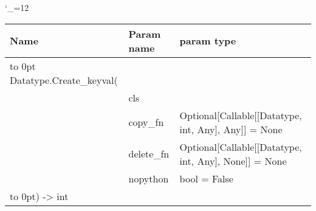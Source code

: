 \begingroup \catcode`\_=12 \tt
\begin{tabular}{lll}
\toprule
\textrm{Name}&\textrm{Param name}&\textrm{param type}\\
\midrule
\hbox to 0pt {Datatype.Create_keyval(\hss}\\
& cls\\
& copy_fn & Optional[Callable[[Datatype, int, Any], Any]] = None\\
& delete_fn & Optional[Callable[[Datatype, int, Any], None]] = None\\
& nopython & bool = False\\
\hbox to 0pt{) -> int\hss}\\
\bottomrule
\end{tabular}
\endgroup
